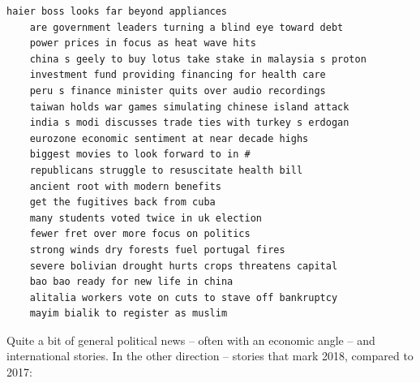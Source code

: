 \documentclass{scrartcl}
\begin{document}
\begin{lstlisting}[basicstyle=\tiny\hlfont]
    haier boss looks far beyond appliances
    are government leaders turning a blind eye toward debt
    power prices in focus as heat wave hits
    china s geely to buy lotus take stake in malaysia s proton
    investment fund providing financing for health care
    peru s finance minister quits over audio recordings
    taiwan holds war games simulating chinese island attack
    india s modi discusses trade ties with turkey s erdogan
    eurozone economic sentiment at near decade highs
    biggest movies to look forward to in #
    republicans struggle to resuscitate health bill
    ancient root with modern benefits
    get the fugitives back from cuba
    many students voted twice in uk election
    fewer fret over more focus on politics
    strong winds dry forests fuel portugal fires
    severe bolivian drought hurts crops threatens capital
    bao bao ready for new life in china
    alitalia workers vote on cuts to stave off bankruptcy
    mayim bialik to register as muslim
\end{lstlisting}

Quite a bit of general political news -- often with an economic angle -- and international stories. In the other direction -- stories that mark 2018, compared to 2017:
\end{document}
